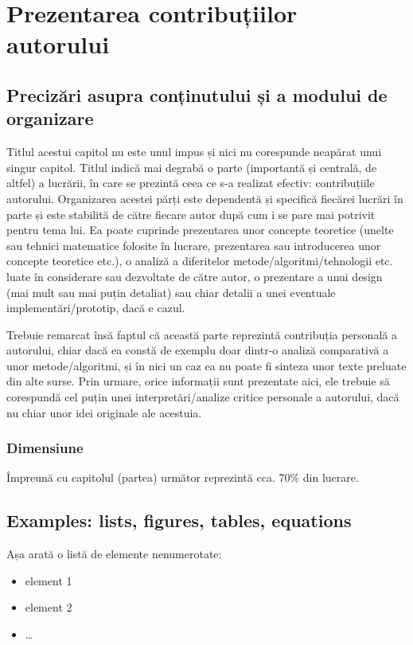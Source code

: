 \chapter{Prezentarea contribuțiilor autorului}
\label{cap:contributii}

\section{Precizări asupra conținutului și a modului de organizare}

Titlul acestui capitol nu este unul impus și nici nu corespunde neapărat unui singur capitol. Titlul indică mai degrabă o parte (importantă și centrală, de altfel) a lucrării, în care se prezintă ceea ce s-a realizat efectiv: contribuțiile autorului. Organizarea acestei părți este dependentă și specifică fiecărei lucrări în parte și este stabilită de către fiecare autor după cum i se pare mai potrivit pentru tema lui. Ea poate cuprinde prezentarea unor concepte teoretice (unelte sau tehnici matematice folosite în lucrare, prezentarea sau introducerea unor concepte teoretice etc.), o analiză a diferitelor metode/algoritmi/tehnologii etc. luate în considerare sau dezvoltate de către autor, o prezentare a unui design (mai mult sau mai puțin detaliat) sau chiar detalii a unei eventuale implementări/prototip, dacă e cazul.

Trebuie remarcat însă faptul că această parte reprezintă contribuția personală a autorului, chiar dacă ea constă de exemplu doar dintr-o analiză comparativă a unor metode/algoritmi, și în nici un caz ea nu poate fi sinteza unor texte preluate din alte surse. Prin urmare, orice informații sunt prezentate aici, ele trebuie să corespundă cel puțin unei interpretări/analize critice personale a autorului, dacă nu chiar unor idei originale ale acestuia. 

\subsection{Dimensiune}

Împreună cu capitolul (partea) următor reprezintă cca. 70\% din lucrare. 


\section{Examples: lists, figures, tables, equations}

Așa arată o listă de elemente nenumerotate:
\begin{itemize}
  \item element 1
  \item element 2
  \item \dots
\end{itemize}


